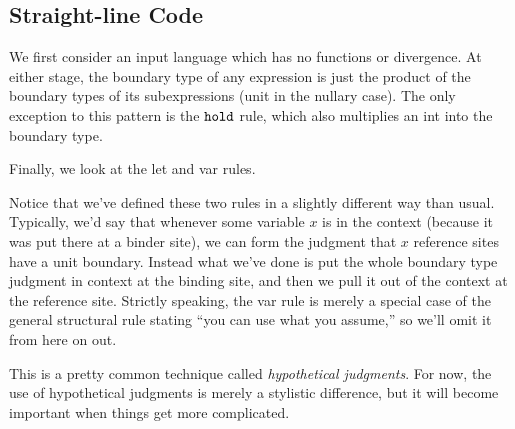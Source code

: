 \documentclass[]{article}
\newcommand {\next}{asdlfkj}
\begin{document}
\begin{abstrsyn}
\section{Straight-line Code}

We first consider an input language which has no functions or divergence.
At either stage, the boundary type of any expression is 
just the product of the boundary types of its subexpressions
(unit in the nullary case).
The only exception to this pattern is the ${\tt hold}$ rule,
which also multiplies an int into the boundary type.


Finally, we look at the let and var rules.

Notice that we've defined these two rules in a slightly different way than usual.
Typically, we'd say that whenever some variable $x$ is in the context 
(because it was put there at a binder site),
we can form the judgment that $x$ reference sites have a unit boundary.
Instead what we've done is put the whole boundary type judgment in context at the binding site,
and then we pull it out of the context at the reference site.
Strictly speaking, the var rule is merely a special case of the 
general structural rule stating ``you can use what you assume,'' so we'll omit it from here on out.

This is a pretty common technique  called {\em hypothetical judgments}.
For now, the use of hypothetical judgments is merely a stylistic difference,
but it will become important when things get more complicated.


\end{abstrsyn}
\end{document}
